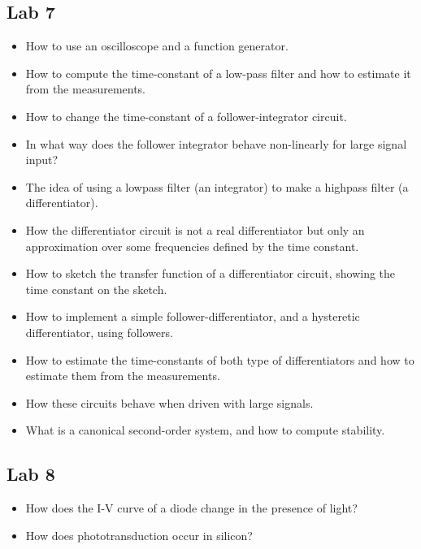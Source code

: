 \documentclass[main]{subfiles}
\begin{document}
\subsection{Lab 7}
\begin{itemize}
\item How to use an oscilloscope and a function generator. 
\item How to compute the time-constant of a low-pass filter and how to estimate it from the measurements. 
\item How to change the time-constant of a follower-integrator circuit. 
\item In what way does the follower integrator behave non-linearly for large signal input?
\item The idea of using a lowpass filter (an integrator) to make a highpass
filter (a differentiator).
\item How the differentiator circuit is not a real differentiator but only an approximation over some frequencies defined by the time constant. 
\item How to sketch the transfer function of a differentiator circuit, showing the time constant on the sketch. 
\item How to implement a simple follower-differentiator, and a hysteretic differentiator, using followers. 
\item How to estimate the time-constants of both type of differentiators and how to
estimate them from the measurements.
\item How these circuits behave when driven with large signals. 
\item What is a canonical second-order system, and how to compute stability.
\end{itemize}


\subsection{Lab 8}
\begin{itemize}
\item How does the I-V curve of a diode change in the presence of light? 
\item How does phototransduction occur in silicon?
\end{itemize}
\end{document}
